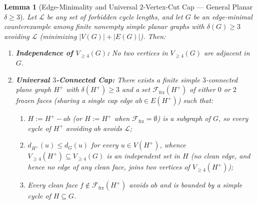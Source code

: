 \documentclass[11pt,reqno]{amsart}
\theoremstyle{plain}
\newtheorem{lemma}[theorem]{Lemma}
\theoremstyle{definition}
\theoremstyle{remark}
\newcommand{\Ffrz}{\mathcal{F}_{\mathrm{frz}}}
\newcommand{\Vge}{V_{\ge 4}}
\DeclareRobustCommand{\_}{\ifmmode\text{\textunderscore}\else\textunderscore\allowbreak\fi}
\begin{document}
\begin{lemma}[Edge-Minimality and Universal $2$-Vertex-Cut Cap --- General Planar $\delta \ge 3$]\label{lem:general-cap}
Let $\mathcal{L}$ be any set of forbidden cycle lengths, and let $G$ be an edge-minimal counterexample among finite nonempty simple planar graphs with $\delta(G) \ge 3$ avoiding $\mathcal{L}$ (minimizing $|V(G)| + |E(G)|$). Then:
\begin{enumerate}[label=(\roman*),leftmargin=2.2em]
  \item \textbf{Independence of $\Vge(G)$:} No two vertices in $\Vge(G)$ are adjacent in $G$.
  \item \textbf{Universal $3$-Connected Cap:} There exists a finite simple $3$-connected plane graph $H^+$ with $\delta(H^+) \ge 3$ and a set $\Ffrz(H^+)$ of either $0$ or $2$ frozen faces (sharing a single cap edge $ab \in E(H^+)$) such that:
  \begin{enumerate}[label=(\alph*),leftmargin=1.8em]
    \item $H := H^+ - ab$ (or $H := H^+$ when $\Ffrz = \emptyset$) is a subgraph of $G$, so every cycle of $H^+$ avoiding $ab$ avoids $\mathcal{L}$;
    \item $d_{H^+}(u) \le d_G(u)$ for every $u \in V(H^+)$, whence $\Vge(H^+) \subseteq \Vge(G)$ is an independent set in $H$ (no clean edge, and hence no edge of any clean face, joins two vertices of $\Vge(H^+)$);
    \item Every clean face $f \notin \Ffrz(H^+)$ avoids $ab$ and is bounded by a simple cycle of $H \subseteq G$.
  \end{enumerate}
\end{enumerate}
\end{lemma}
\end{document}
